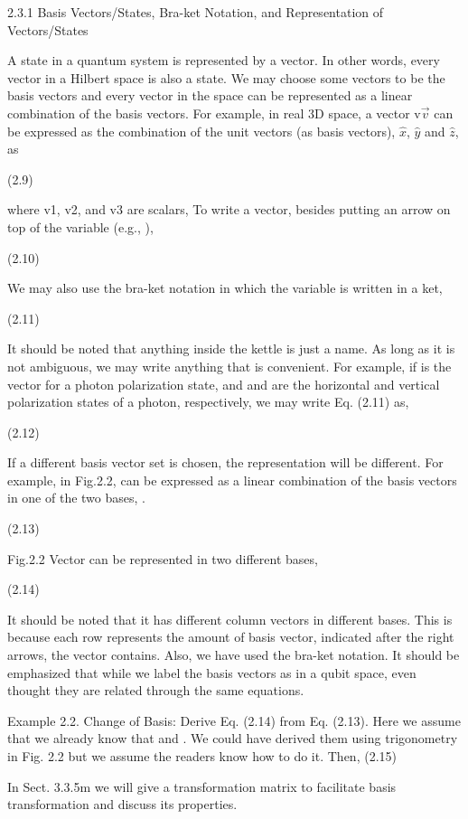 \documentclass{article}
\begin{document}
2.3.1 Basis Vectors/States, Bra-ket Notation, and Representation of Vectors/States

A state in a quantum system is represented by a vector. In other words, every vector in a Hilbert space is also a state. We may choose some vectors to be the basis vectors and every vector in the space can be represented as a linear combination of the basis vectors. For example, 
in real 3D space, a vector v$\vec{v}$ can be expressed as the combination of the unit vectors (as basis vectors),  $\hat{x}$, $\hat{y}$ and $\hat{z}$, as

			(2.9)

where v1, v2, and v3 are scalars,
To write a vector, besides putting an arrow on top of the variable (e.g., ),

 		(2.10)

We may also use the bra-ket notation in which the variable is written in a ket,

		(2.11)

It should be noted that anything inside the kettle is just a name. As long as it is not ambiguous, we may write anything that is convenient. For example, if  is the vector for a photon polarization state, and  and  are the horizontal and vertical polarization states of a photon, respectively, we may write Eq. (2.11) as, 


(2.12)

If a different basis vector set is chosen, the representation will be different. For example, in Fig.2.2,  can be expressed as a linear combination of the basis vectors in one of the two bases, .

		(2.13)


Fig.2.2 Vector  can be represented in two different bases, 






















		(2.14)


It should be noted that it has different column vectors in different bases. This is because each row represents the amount of basis vector, indicated after the right arrows, the vector contains. Also, we have used the bra-ket notation. It should be emphasized that while we label the basis vectors as  in a qubit space, even thought they are related through the same equations.

Example 2.2. Change of Basis: Derive Eq. (2.14) from Eq. (2.13).
Here we assume that we already know that  and . We could have derived them using trigonometry in Fig. 2.2 but we assume the readers know how to do it. Then,
		(2.15)

In Sect. 3.3.5m we will give a transformation matrix to facilitate basis transformation and discuss its properties.
\end{document}
